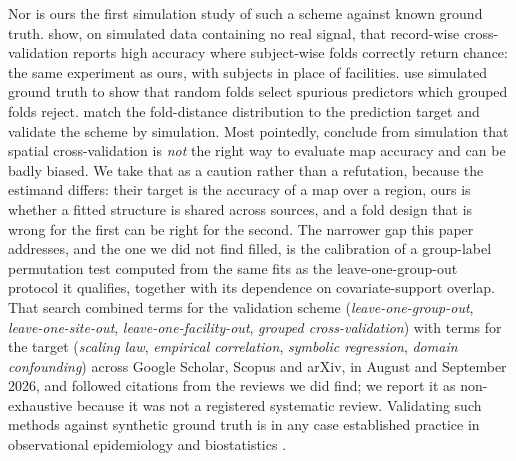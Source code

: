 \documentclass[journal=dce]{CUP-JNL-DTM}%
\begin{document}
Nor is ours the first simulation study of such a scheme against known ground truth. \citet{saeb2017need} show, on simulated data containing no real signal, that record-wise cross-validation reports high accuracy where subject-wise folds correctly return chance: the same experiment as ours, with subjects in place of facilities. \citet{meyer2019importance} use simulated ground truth to show that random folds select spurious predictors which grouped folds reject. \citet{mila2022nearest} match the fold-distance distribution to the prediction target and validate the scheme by simulation. Most pointedly, \citet{wadoux2021spatial} conclude from simulation that spatial cross-validation is \emph{not} the right way to evaluate map accuracy and can be badly biased. We take that as a caution rather than a refutation, because the estimand differs: their target is the accuracy of a map over a region, ours is whether a fitted structure is shared across sources, and a fold design that is wrong for the first can be right for the second. The narrower gap this paper addresses, and the one we did not find filled, is the calibration of a group-label permutation test computed from the same fits as the leave-one-group-out protocol it qualifies, together with its dependence on covariate-support overlap. That search combined terms for the validation scheme (\emph{leave-one-group-out}, \emph{leave-one-site-out}, \emph{leave-one-facility-out}, \emph{grouped cross-validation}) with terms for the target (\emph{scaling law}, \emph{empirical correlation}, \emph{symbolic regression}, \emph{domain confounding}) across Google Scholar, Scopus and arXiv, in August and September 2026, and followed citations from the reviews we did find; we report it as non-exhaustive because it was not a registered systematic review. Validating such methods against synthetic ground truth is in any case established practice in observational epidemiology and biostatistics \citep{varga2023scoping}.
\end{document}
